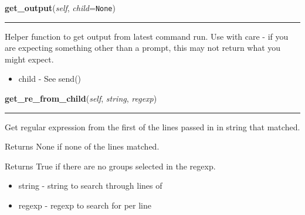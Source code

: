     \label{shutit_global:ShutIt:get_output}

    \vspace{0.5ex}

\hspace{.8\funcindent}\begin{boxedminipage}{\funcwidth}

    \raggedright \textbf{get\_output}(\textit{self}, \textit{child}={\tt None})

    \vspace{-1.5ex}

    \rule{\textwidth}{0.5\fboxrule}
\setlength{\parskip}{2ex}
    Helper function to get output from latest command run. Use with care - 
    if you are expecting something other than a prompt, this may not return
    what you might expect.

    \begin{itemize}
    \setlength{\parskip}{0.6ex}
      \item child       - See send()

    \end{itemize}

\setlength{\parskip}{1ex}
    \end{boxedminipage}

    \label{shutit_global:ShutIt:get_re_from_child}

    \vspace{0.5ex}

\hspace{.8\funcindent}\begin{boxedminipage}{\funcwidth}

    \raggedright \textbf{get\_re\_from\_child}(\textit{self}, \textit{string}, \textit{regexp})

    \vspace{-1.5ex}

    \rule{\textwidth}{0.5\fboxrule}
\setlength{\parskip}{2ex}
    Get regular expression from the first of the lines passed in in string 
    that matched.

    Returns None if none of the lines matched.

    Returns True if there are no groups selected in the regexp.

    \begin{itemize}
    \setlength{\parskip}{0.6ex}
      \item string - string to search through lines of

      \item regexp - regexp to search for per line

    \end{itemize}

\setlength{\parskip}{1ex}
    \end{boxedminipage}

